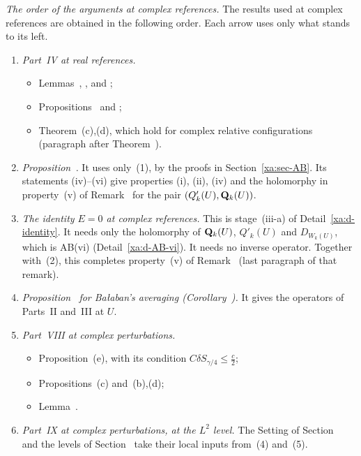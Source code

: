 \begin{detail}\label{xa:d-dag}
\emph{The order of the arguments at complex references.} The results used at complex references are obtained in the following order. Each arrow uses only what stands to its left.
\begin{enumerate}[label=(\arabic*)]
\item \emph{Part~IV at real references.}
  \begin{itemize}
  \item Lemmas~, ,  and ;
  \item Propositions~ and ;
  \item Theorem~(c),(d), which hold for complex relative configurations (paragraph after Theorem~).
  \end{itemize}
\item \emph{Proposition~.} It uses only~(1), by the proofs in Section~\ref{xa:sec-AB}. Its statements (iv)--(vi) give properties (i), (ii), (iv) and the holomorphy in property~(v) of Remark~ for the pair $(Q'_k(U),\mathbf Q_k(U))$.
\item \emph{The identity $E=0$ at complex references.} This is stage~(iii-a) of Detail~\ref{xa:d-identity}. It needs only the holomorphy of $\mathbf Q_k(U)$, $Q'_k(U)$ and $D_{W_k(U)}$, which is AB(vi) (Detail~\ref{xa:d-AB-vi}). It needs no inverse operator. Together with~(2), this completes property~(v) of Remark~ (last paragraph of that remark).
\item \emph{Proposition~ for Ba\l aban's averaging (Corollary~).} It gives the operators of Parts~II and~III at $U$.
\item \emph{Part~VIII at complex perturbations.}
  \begin{itemize}
  \item Proposition~(e), with its condition $C\delta S_{\gamma/4}\le\frac c2$;
  \item Propositions~(c) and~(b),(d);
  \item Lemma~.
  \end{itemize}
\item \emph{Part~IX at complex perturbations, at the $L^2$ level.} The Setting of Section~ and the levels of Section~ take their local inputs from~(4) and~(5).

\end{enumerate}
\end{detail}
